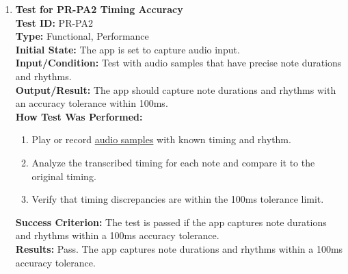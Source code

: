\documentclass[12pt, titlepage]{article}
\begin{document}
\begin{enumerate}
    \item \textbf{Test for PR-PA2 Timing Accuracy} \\
      \newline
      \textbf{Test ID:} PR-PA2 \\
      \textbf{Type:} Functional, Performance \\
      \textbf{Initial State:} The app is set to capture audio input. \\
      \textbf{Input/Condition:} Test with audio samples that have precise note durations and rhythms. \\
      \textbf{Output/Result:} The app should capture note durations and rhythms with an accuracy tolerance within 100ms. \\
      \textbf{How Test Was Performed:}
      \begin{enumerate}
          \item Play or record 
          \href{https://github.com/emilyperica/ScoreGen/tree/main/test/TestingDatasets/piano-samples/sample-songs}{audio samples} 
          with known timing and rhythm.
          \item Analyze the transcribed timing for each note and compare it to the original timing.
          \item Verify that timing discrepancies are within the 100ms tolerance limit.
      \end{enumerate}
      \textbf{Success Criterion:} The test is passed if the app captures note durations and rhythms within a 100ms accuracy tolerance.\\
      \textbf{Results:} Pass. The app captures note durations and rhythms within a 100ms accuracy tolerance.\\


\end{enumerate}
\end{document}
